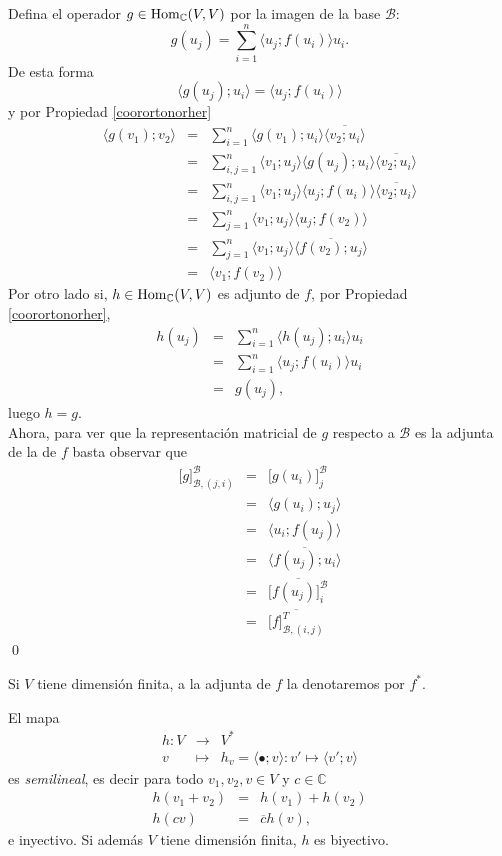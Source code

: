 \dem Defina el operador $g\in\operatorname{Hom}_\mathbb{C}(V,V)$ por la imagen de la base $\mathcal{B}$:
\[
g(u_j)=\sum_{i=1}^n\langle u_j;f(u_i)\rangle u_i.
\]
De esta forma
\[
\langle g(u_j);u_i\rangle=\langle u_j;f(u_i)\rangle
\]
y por Propiedad \ref{coorortonorher}
\begin{eqnarray*}
\langle g(v_1); v_2\rangle & = & \sum_{i=1}^n\langle g(v_1);u_i\rangle\overline{\langle v_2;u_i\rangle}\\
 & = & \sum_{i,j=1}^n\langle v_1;u_j\rangle\langle g(u_j);u_i\rangle \overline{\langle v_2;u_i\rangle}\\
 & = & \sum_{i,j=1}^n\langle v_1;u_j\rangle\langle u_j;f(u_i)\rangle \overline{\langle v_2;u_i\rangle}\\
 & = & \sum_{j=1}^n\langle v_1;u_j\rangle\langle u_j;f(v_2)\rangle\\
 & = & \sum_{j=1}^n\langle v_1;u_j\rangle\overline{\langle f(v_2);u_j\rangle}\\
 & = & \langle v_1; f(v_2)\rangle
\end{eqnarray*}
Por otro lado si, $h\in\operatorname{Hom}_\mathbb{C}(V,V)$ es adjunto de $f$, por Propiedad \ref{coorortonorher},
\begin{eqnarray*}
h(u_j) & = & \sum_{i=1}^n \langle h(u_j);u_i\rangle u_i\\
         & = & \sum_{i=1}^n \langle u_j;f(u_i)\rangle u_i\\
         & = & g(u_j),
\end{eqnarray*}
luego $h=g$.\\
Ahora, para ver que la representaci\'on matricial de $g$ respecto a $\mathcal{B}$ es la adjunta de la de $f$ basta observar que
\begin{eqnarray*}
\Big[g\Big]^\mathcal{B}_{\mathcal{B},(j,i)} & = & \Big[g(u_i)\Big]^\mathcal{B}_j\\
  & = & \langle g(u_i);u_j \rangle\\
  & = & \langle u_i;f(u_j) \rangle\\
  & = & \overline{\langle f(u_j);u_i\rangle}\\
  & = & \overline{\Big[f(u_j)\Big]^\mathcal{B}_i}\\
  & = & \overline{\Big[f\Big]^T_{\mathcal{B},(i,j)}}
\end{eqnarray*}
\qed

\begin{nota}
Si $V$ tiene dimensi\'on finita, a la adjunta de $f$ la denotaremos por $f^*$.
\end{nota}

\begin{pro}
El mapa
\begin{eqnarray*}
h: V & \longrightarrow & V^*\\
            v & \longmapsto & h_v=\langle \bullet; v\rangle: v'\mapsto\langle v';v\rangle
\end{eqnarray*}
es \emph{semilineal}, es decir para todo $v_1,v_2,v\in V$ y $c\in\mathbb{C}$
\begin{eqnarray*}
h(v_1+v_2) & = & h(v_1)+h(v_2)\\
h(cv) & = & \overline{c}h(v),
\end{eqnarray*}
e inyectivo. Si adem\'as $V$ tiene dimensi\'on finita, $h$ es biyectivo.
\end{pro}

